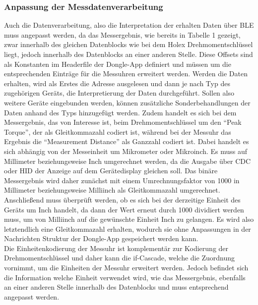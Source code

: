 \subsubsection{Anpassung der Messdatenverarbeitung}
Auch die Datenverarbeitung, also die Interpretation der erhalten Daten über \ac{BLE} muss angepasst werden, da das Messergebnis, wie bereits in Tabelle 1 gezeigt, zwar innerhalb des gleichen Datenblocks wie bei dem Holex Drehmomentschlüssel liegt, jedoch innerhalb des Datenblocks an einer anderen Stelle. Diese Offsets sind als Konstanten im Headerfile der Dongle-App definiert und müssen um die entsprechenden Einträge für die Messuhren erweitert werden. Werden die Daten erhalten, wird als Erstes die Adresse ausgelesen und dann je nach Typ des zugehörigen Geräts, die Interpretierung der Daten durchgeführt. Sollen also weitere Geräte eingebunden werden, können zusätzliche Sonderbehandlungen der Daten anhand des Typs hinzugefügt werden. Zudem handelt es sich bei dem Messergebnis, das von Interesse ist, beim Drehmomentschlüssel um den ``Peak Torque'', der als Gleitkommazahl codiert ist, während bei der Messuhr das Ergebnis die ``Measurement Distance'' als Ganzzahl codiert ist. Dabei handelt es sich abhängig von der Messeinheit um Mikrometer oder Mikroinch. Es muss auf Millimeter beziehungsweise Inch umgerechnet werden, da die Ausgabe über \ac{CDC} oder \ac{HID} der Anzeige auf dem Gerätedisplay gleichen soll. Das binäre Messergebnis wird daher zunächst mit einem Umrechnungsfaktor von 1000 in Millimeter beziehungsweise Milliinch als Gleitkommazahl umgerechnet. Anschließend muss überprüft werden, ob es sich bei der derzeitige Einheit des Geräts um Inch handelt, da dann der Wert erneut durch 1000 dividiert werden muss, um von Milliinch auf die gewünschte Einheit Inch zu gelangen. Es wird also letztendlich eine Gleitkommazahl erhalten, wodurch sie ohne Anpassungen in der Nachrichten Struktur der Dongle-App gespeichert werden kann.\\
Die Einheitenkodierung der Messuhr ist komplementär zur Kodierung der Drehmomentschlüssel und daher kann die if-Cascade, welche die Zuordnung vornimmt, um die Einheiten der Messuhr erweitert werden. Jedoch befindet sich die Information welche Einheit verwendet wird, wie das Messergebnis, ebenfalls an einer anderen Stelle innerhalb des Datenblocks und muss entsprechend angepasst werden.

